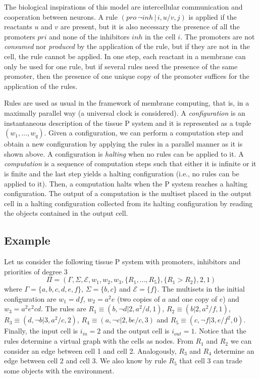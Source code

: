 \documentclass[journal]{IEEEtran}
\begin{document}
The biological inspirations of this model are intercellular
communication and cooperation between neurons. A rule $(pro\,\neg
inh\,|\,i,u/v,j)$ is applied if the reactants $u$ and $v$ are
present, but it is also necessary the presence of all the promoters
$pri$ and none of the inhibitors $inh$ in the cell $i$. The
promoters are not \emph{consumed} nor \emph{produced} by the
application of the rule, but if they are not in the cell, the rule
cannot be applied. In one step, each reactant in a membrane can only
be used for one rule, but if several rules need the presence of the
same promoter, then the presence of one unique copy of the promoter
suffices for the application of the rules.

Rules are used as usual in the framework of membrane computing, that is, in a
maximally parallel way (a universal clock is considered). A \emph{configuration}
is an instantaneous description of the tissue P system and it is represented as
a tuple $(w_1,\dots,w_q)$. Given a configuration, we can perform a computation
step and obtain a new configuration by applying the rules in a parallel manner
as it is shown above. A configuration is \emph{halting} when no rules can be
applied to it. A {\it computation} is a sequence of computation steps such that
either it is infinite or it is finite and the last step yields a halting
configuration (i.e., no rules can be applied to it). Then, a computation halts
when the P system reaches a halting configuration. The output of a computation
is the multiset placed in the output cell in a halting configuration collected
from its halting configuration by reading the objects contained in the output
cell.

\subsection{Example} \label{sec:example}
Let us consider the following tissue P system with promoters,
inhibitors and priorities of degree 3
$$\Pi=(\Gamma,\Sigma,\mathcal{E},w_1,w_2,w_3,\{R_1, \ldots, R_5\},\{R_1>R_2\},2,1)$$
\noindent where $\Gamma=\{a,b,c,d,e,f\}$, $\Sigma=\{b,c\}$ and
$\mathcal{E}=\{f\}$. The multisets in the initial configuration are
$w_1=df$, $w_2=a^2e$ (two copies of $a$ and one copy of $e$) and $w_3=a^2e^2cd$.
The rules are $R_1\equiv (b,\neg d|2,a^2/d,1)$, $R_2\equiv (b |2,a^2/f,1)$,
$R_3\equiv (d,\neg b| 3,a^2/c,2)$, $R_4\equiv (a,\neg c| 2,be/c,3)$ and
$R_5\equiv (c,\neg f |3,e/f^2,0)$. Finally, the input cell is $i_{in}=2$ and the
output cell is $i_{out}=1$. Notice that the rules determine a virtual graph with
the cells as nodes. From $R_1$ and $R_2$ we can consider an edge between cell 1
and cell 2. Analogously, $R_3$ and $R_4$ determine an edge between cell 2 and
cell 3. We also know by rule $R_5$ that cell 3 can trade some objects with the
environment.
\end{document}
